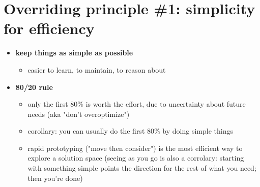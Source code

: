 \section*{Overriding principle \#1: simplicity for efficiency}
\begin{itemize}
\item {\bf keep things as simple as possible}

	\begin{itemize}
	\item easier to learn, to maintain, to reason about
	\end{itemize}

\item {\bf 80/20 rule}
	
	\begin{itemize}
	\item only the first 80\% is worth the effort, due to 
	uncertainty	about future needs (aka "don't overoptimize")

	\item corollary: you can usually do the first 80\% by doing simple things

	\item rapid prototyping ("move then consider") is the most efficient way to 
		explore a solution space
		(seeing as you go is also a corrolary: starting with something simple
		points the direction for the rest of what you need; then you're done)
	\end{itemize}
\end{itemize}

